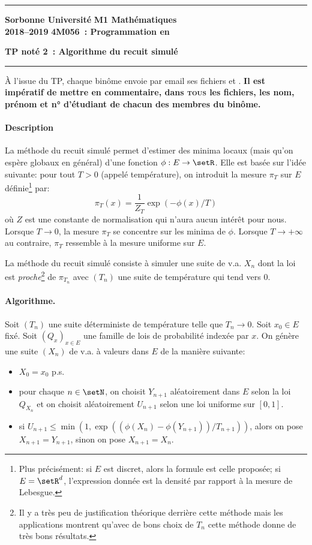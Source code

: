 \documentclass[10pt]{article}
\begin{document}
\hrule \vspace*{5pt} \noindent 
\textbf{Sorbonne Université} \hfill \textbf{M1 Mathématiques}\\
\textbf{2018--2019} \hfill \textbf{4M056~: Programmation en \CPP}
\begin{center}
\textbf{TP not\'e 2~: Algorithme du recuit simulé}
\end{center}
\hrule \vspace*{20pt}

À l'issue du TP, chaque binôme envoie par email ses fichiers  et .
\textbf{Il est imp\'eratif de mettre en commentaire, dans
\textsc{tous} les fichiers, les nom, pr\'enom et n° d'\'etudiant de chacun des
membres du bin\^ome.}

\paragraph{Description}

La méthode du recuit simulé permet d'estimer des minima locaux (mais qu'on espère globaux en général) d'une fonction $\phi: E \to \setR$. Elle est basée sur l'idée suivante: pour tout $T>0$ (appelé température), on introduit la mesure $\pi_T$ sur $E$ définie\footnote{Plus précisément: si $E$ est discret, alors la formule est celle proposée; si $E=\setR^d$, l'expression donnée est la densité par rapport à la mesure de Lebesgue.} par:
\[
\pi_T(x) = \frac{1}{Z_T} \exp( -\phi(x)/T )
\]
où $Z$ est une constante de normalisation qui n'aura aucun intérêt pour nous. Lorsque $T\to 0$, la mesure $\pi_T$ se concentre sur les minima de $\phi$. Lorsque $T\to+\infty$ au contraire, $\pi_T$ ressemble à la mesure uniforme sur $E$.

La méthode du recuit simulé consiste à simuler une suite de v.a. $X_n$ dont la loi est \emph{proche}\footnote{Il y a très peu de justification théorique derrière cette méthode mais les applications montrent qu'avec de bons choix de $T_n$ cette méthode donne de très bons résultats.} de $\pi_{T_n}$ avec $(T_n)$ une suite de température qui tend vers $0$.

\paragraph{Algorithme.} Soit $(T_n)$ une suite déterministe de température telle que $T_n\to 0$. Soit $x_0\in E$ fixé. Soit $(Q_x)_{x\in E}$ une famille de lois de probabilité indexée par $x$. On génère une suite $(X_n)$ de v.a. à valeurs dans $E$ de la manière suivante:
\begin{itemize}
\item $X_0=x_0$ p.s.
\item pour chaque $n\in\setN$, on choisit $Y_{n+1}$ aléatoirement dans $E$ selon la loi $Q_{X_n}$ et on choisit aléatoirement $U_{n+1}$ selon une loi uniforme sur $[0,1]$.
\item si $U_{n+1} \leq \min(1,\exp( (\phi(X_n)-\phi(Y_{n+1}))/T_{n+1}) )$, alors on pose $X_{n+1}=Y_{n+1}$, sinon on pose $X_{n+1}=X_{n}$.
\end{itemize}
\end{document}
